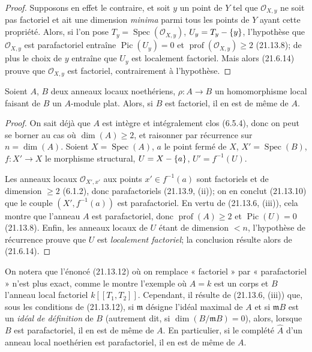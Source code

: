 \begin{proof}
Supposons en effet le contraire, et soit $y$ un point de $Y$ tel que
$\mathcal O_{X,y}$ ne soit pas factoriel et ait une dimension \emph{minima} parmi
tous les points de $Y$ ayant cette propriété. Alors, si l'on pose
$T_y=\operatorname{Spec}(\mathcal O_{X,y})$, $U_y=T_y-\{y\}$, l'hypothèse que
$\mathcal O_{X,y}$ est parafactoriel entraîne $\operatorname{Pic}(U_y)=0$ et
$\operatorname{prof}(\mathcal O_{X,y})\geq2$ (21.13.8); de plus le choix de $y$
entraîne que $U_y$ est localement factoriel. Mais alors (21.6.14) prouve que
$\mathcal O_{X,y}$ est factoriel, contrairement à l'hypothèse.
\end{proof}

\begin{proposition}[21.13.12]
\label{IV.21.13.12}
Soient $A$, $B$ deux anneaux locaux noethériens,
$\rho:A\to B$ un homomorphisme local faisant de $B$ un $A$-module plat. Alors, si
$B$ est factoriel, il en est de même de $A$.
\end{proposition}

\begin{proof}
On sait déjà que $A$ est intègre et intégralement clos (6.5.4), donc on peut se borner
au cas où $\dim(A)\geq2$, et raisonner par récurrence sur $n=\dim(A)$. Soient
$X=\operatorname{Spec}(A)$, $a$ le point fermé de $X$,
$X'=\operatorname{Spec}(B)$, $f:X'\to X$ le morphisme structural,
$U=X-\{a\}$, $U'=f^{-1}(U)$.

Les anneaux locaux $\mathcal O_{X',x'}$ aux points $x'\in f^{-1}(a)$ sont factoriels
et de dimension $\geq2$ (6.1.2), donc parafactoriels (21.13.9, (ii)); on en conclut
(21.13.10) que le couple $(X',f^{-1}(a))$ est parafactoriel. En vertu de (21.13.6,
(iii)), cela montre que l'anneau $A$ est parafactoriel, donc
$\operatorname{prof}(A)\geq2$ et $\operatorname{Pic}(U)=0$ (21.13.8). Enfin, les
anneaux locaux de $U$ étant de dimension $<n$, l'hypothèse de récurrence prouve que
$U$ est \emph{localement factoriel}; la conclusion résulte alors de (21.6.14).
\end{proof}

\begin{env}[21.13.12.1]
\label{IV.21.13.12.1}
On notera que l'énoncé (21.13.12) où on remplace « factoriel » par « parafactoriel »
n'est plus exact, comme le montre l'exemple où $A=k$ est un corps et $B$ l'anneau
local factoriel $k[[T_1,T_2]]$. Cependant, il résulte de (21.13.6, (iii)) que, sous
les conditions de (21.13.12), si $\mathfrak m$ désigne l'idéal maximal de $A$ et si
$\mathfrak mB$ est un \emph{idéal}
\emph{de définition} de $B$ (autrement dit, si $\dim(B/\mathfrak mB)=0$), alors,
lorsque $B$ est parafactoriel, il en est de même de $A$. En particulier, si le
complété $\widehat A$ d'un anneau local noethérien est parafactoriel, il en est de
même de $A$.
\end{env}


